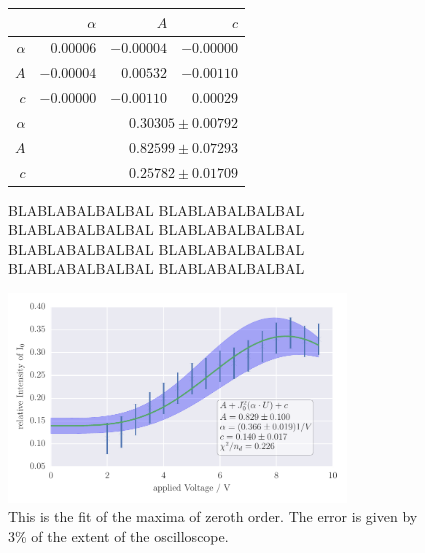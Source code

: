 \begin{figure}
\caption{
BLABLABALBALBAL
BLABLABALBALBAL
BLABLABALBALBAL
BLABLABALBALBAL
BLABLABALBALBAL
BLABLABALBALBAL
BLABLABALBALBAL
BLABLABALBALBAL
}
 \begin{tabular}{|r|r|r|r|}
 \hline 
\cellcolor{tabcolor}&\cellcolor{tabcolor}$\alpha$&\cellcolor{tabcolor}$A$&\cellcolor{tabcolor}$c$\\ \hline 
 \cellcolor{tabcolor}$\alpha$&$0.00006$ &$-0.00004$ &$-0.00000$ \\ 
\cellcolor{tabcolor}$A$&$-0.00004$ &$0.00532$ &$-0.00110$ \\ 
\cellcolor{tabcolor}$c$&$-0.00000$ &$-0.00110$ &$0.00029$ \\ \hline \hline
\cellcolor{tabcolor}$\alpha$&\multicolumn{3}{r|}{$0.30305 \pm 0.00792$ }\\ 
\cellcolor{tabcolor}$A$&\multicolumn{3}{r|}{$0.82599 \pm 0.07293$ }\\ 
\cellcolor{tabcolor}$c$&\multicolumn{3}{r|}{$0.25782 \pm 0.01709$ }\\ 
\hline\end{tabular}
\end{figure}
\clearpage
\begin{figure}[htpb]
    \centering
    \includegraphics[width=0.8\textwidth]{analysis/figures/besselfit_002}
    \caption{This is the fit of the maxima of zeroth order. The error is given by 3\% of the extent of the oscilloscope.}
    \label{fig:besselfit_001}
\end{figure}

